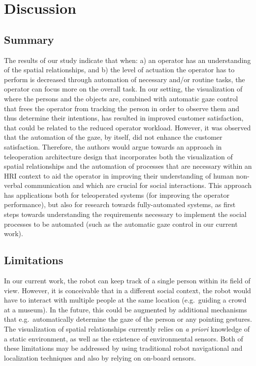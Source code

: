 \documentclass[a4paper, 10pt, conference]{ieeeconf}     %
\begin{document}
\section{Discussion}

\subsection{Summary}
The results of our study indicate that when: a) an operator has an understanding of the spatial relationships, and b) the level of actuation the operator has to perform is decreased through automation of necessary and/or routine tasks, the operator can focus more on the overall task. 
In our setting, the visualization of where the persons and the objects are, combined with automatic gaze control that frees the operator from tracking the person in order to observe them and thus determine their intentions, has resulted in improved customer satisfaction, that could be related to the reduced operator workload. 
However, it was observed that the automation of the gaze, by itself, did not enhance the customer satisfaction. 
Therefore, the authors would argue towards an approach in teleoperation architecture design that incorporates both the visualization of spatial relationships and the automation of processes that are necessary within an HRI context to aid the operator in improving their understanding of human non-verbal communication and which are crucial for social interactions.
This approach has applications both for teleoperated systems (for improving the operator performance), but also for research towards fully-automated systems, as first steps towards understanding the requirements necessary to implement the social processes to be automated (such as the automatic gaze control in our current work). 

\subsection{Limitations}
In our current work, the robot can keep track of a single person within its field of view. 
However, it is conceivable that in a different social context, the robot would have to interact with multiple people at the same location (e.g.\ guiding a crowd at a museum).
In the future, this could be augmented by additional mechanisms that e.g.\ automatically determine the gaze of the person or any pointing gestures. 
The visualization of spatial relationships currently relies on \emph{a priori} knowledge of a static environment, as well as the existence of environmental sensors.
Both of these limitations may be addressed by using traditional robot navigational and localization techniques and also by relying on on-board sensors.
 
\end{document}
